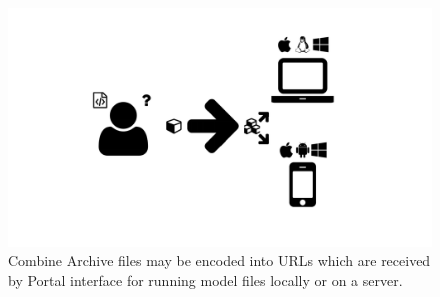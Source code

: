 \begin{figure}
  \centering
  \includegraphics[width=\textwidth,page=14,trim=0.37cm .65cm 0.37cm 0.3cm, clip=true]{images/Figures.pdf}
  \caption{Combine Archive files may be encoded into URLs which are received by Portal interface for running model files locally or on a server.}
  \label{Figure:carbon-combine-archive}
\end{figure}

